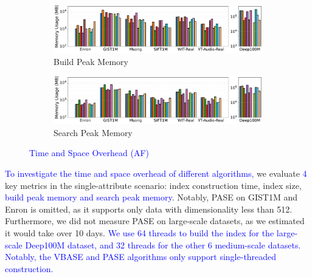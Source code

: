 \documentclass[sigconf, nonacm]{acmart}
\begin{document}
{\begin{figure}[t]
		\begin{subfigure}{\columnwidth}
			\centering
			
			\includegraphics[width=0.99\linewidth]{figures/indexData/exp_7_memory_mb_comparison_query1.pdf}
			\caption{Build Peak Memory }
			\label{fig:build_memory_mb_comparison}
		\end{subfigure}
		
		\begin{subfigure}{\columnwidth}
			\centering

			\includegraphics[width=0.99\linewidth]{figures/searchMem/label_memory_comparison.pdf}
			\caption{Search Peak Memory}
			\label{fig:search_memory_mb_comparison}
		\end{subfigure}
		
		\setlength{\abovecaptionskip}{0.1cm}
		\setlength{\belowcaptionskip}{-0.3cm}
		\caption{\textcolor{blue}{Time and Space Overhead (AF)}}
		\label{fig:build_index_comparison}
	\end{figure}
	
	
	
	\textcolor{blue}{To investigate the time and space overhead of different algorithms,} we evaluate \textcolor{blue}{4} key metrics in the single-attribute scenario: index construction time, index size, \textcolor{blue}{build peak memory and search peak memory}. Notably, PASE on GIST1M and Enron is omitted, as it supports only data with dimensionality less than 512. Furthermore, we did not measure PASE on large-scale datasets, as we estimated it would take over 10 days. \textcolor{blue}{We use 64 threads to build the index for the large-scale Deep100M dataset, and 32 threads for the other 6 medium-scale datasets. Notably, the VBASE and PASE algorithms only support single-threaded construction.}
	
}
\end{document}
